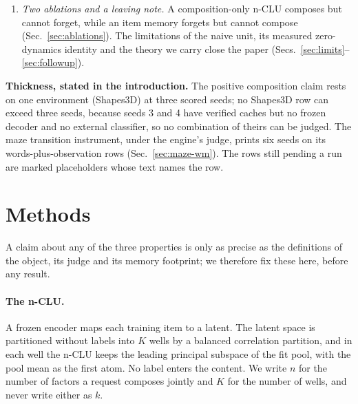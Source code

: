 \documentclass{article} %
\begin{document}
\begin{enumerate}
  symmetric inputs, six seeds, the n-CLU is ahead of
  the best matched baseline on three seeds, level with it on two and behind on one (mean
  +0.046). A colour-relational request coding lifts the n-CLU on every seed, but baselines handed the %
  same columns close most of that gap, so it is an input-representation result, not an n-CLU result
  (Sec.~\ref{sec:maze-wm}). We offer the transition instrument itself as a minor contribution.
\item \emph{Two ablations and a leaving note.} A composition-only n-CLU composes but cannot
  forget, while an item memory forgets but cannot compose (Sec.~\ref{sec:ablations}). The
  limitations of the naive unit, its measured zero-dynamics identity and the theory we carry
  close the paper (Secs.~\ref{sec:limits}--\ref{sec:followup}).
\end{enumerate}

\noindent\textbf{Thickness, stated in the introduction.} The positive composition claim rests
on one environment (Shapes3D) at three scored seeds; no Shapes3D row can exceed three seeds,
because seeds 3 and 4 have verified caches but no frozen decoder and no external classifier, so no
combination of theirs can be judged. %
The maze transition instrument, under the engine's judge, prints six seeds on its words-plus-observation rows
(Sec.~\ref{sec:maze-wm}). The rows still pending a run are marked placeholders whose text names the row.

\section{Methods}
\label{sec:object}


A claim about any of the three properties is only as precise as the definitions of the object,
its judge and its memory footprint; we therefore fix these here, before any result.

\paragraph{The n-CLU.} A frozen encoder maps each training item to a latent. The latent
space is partitioned without labels into $K$ wells by a balanced correlation partition, and in
each well the n-CLU keeps the leading principal subspace of the fit pool, with the pool mean as
the first atom. No label enters the content. We write $n$ for the number of factors a request
composes jointly and $K$ for the number of wells, and never write either as $k$.
\end{document}
